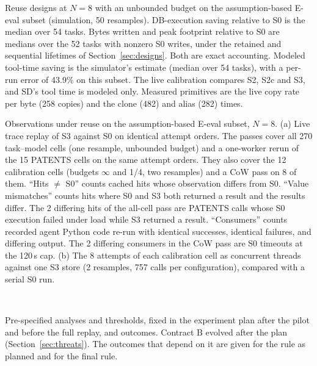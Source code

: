\begin{table}[tbp]
  \caption{Reuse designs at $N=8$ with an unbounded budget on the assumption-based E-eval subset (simulation, 50
  resamples). DB-execution saving relative to S0 is the median over 54 tasks. Bytes written and peak footprint
  relative to S0 are medians over the 52 tasks with nonzero S0 writes, under the retained and sequential lifetimes of
  Section~\ref{sec:designs}. Both are exact accounting. Modeled tool-time saving is the simulator's estimate (median
  over 54 tasks), with a per-run error of 43.9\% on this subset. The live calibration
  compares S2, S2c and S3, and SD's tool time is modeled only. Measured primitives are the live copy rate per byte
  (258 copies) and the clone (482) and alias (282) times.}
  \label{tab:designs}
  \small
  
\end{table}

\begin{table}[tbp]
  \caption{Observations under reuse on the assumption-based E-eval subset, $N=8$. (a) Live trace replay of S3 against
  S0 on identical attempt orders. The passes cover all 270 task--model cells (one resample, unbounded budget) and a
  one-worker rerun of the 15 PATENTS cells on the same attempt orders. They also cover the 12 calibration cells
  (budgets $\infty$ and 1/4, two resamples) and a CoW pass on 8 of them. ``Hits $\neq$ S0'' counts cached hits whose
  observation differs from S0. ``Value mismatches'' counts hits where S0 and S3 both returned a result and the
  results differ. The 2 differing hits of the all-cell pass are PATENTS calls whose S0 execution failed under load
  while S3 returned a result. ``Consumers'' counts recorded agent Python code re-run with identical successes,
  identical failures, and differing output. The 2 differing consumers in the CoW pass are S0 timeouts at the 120\,s
  cap. (b) The 8 attempts of each calibration cell as concurrent threads against one S3 store (2 resamples, 757 calls
  per configuration), compared with a serial S0 run.}
  \label{tab:e2e}
  \small
  \\[4pt]
\end{table}

\begin{table}[tbp]
  \caption{Pre-specified analyses and thresholds, fixed in the experiment plan after the pilot and before the full
  replay, and outcomes. Contract B evolved after the plan (Section~\ref{sec:threats}). The outcomes that depend on it
  are given for the rule as planned and for the final rule.}
  \label{tab:prereg}
  \small
  
\end{table}
